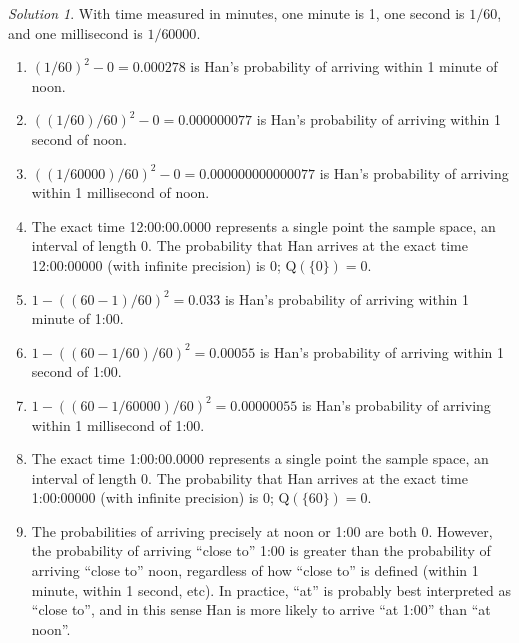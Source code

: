 \documentclass[
  letterpaper,
  DIV=11,
  numbers=noendperiod]{scrreprt}
\providecommand{\tightlist}{%
  \setlength{\itemsep}{0pt}\setlength{\parskip}{0pt}}
\theoremstyle{plain}
\theoremstyle{definition}
\theoremstyle{definition}
\theoremstyle{definition}
\theoremstyle{remark}
\newtheorem{refsolution}{Solution}[chapter]
\begin{document}
\begin{tcolorbox}[enhanced jigsaw, opacityback=0, rightrule=.15mm, coltitle=black, colframe=quarto-callout-tip-color-frame, toprule=.15mm, colbacktitle=quarto-callout-tip-color!10!white, opacitybacktitle=0.6, left=2mm, toptitle=1mm, breakable, title={Solution (click to expand)}, bottomtitle=1mm, colback=white, leftrule=.75mm, titlerule=0mm, arc=.35mm, bottomrule=.15mm]

\begin{refsolution}
With time measured in minutes, one minute is 1, one second is \(1/60\),
and one millisecond is \(1/60000\).

\begin{enumerate}
\def\labelenumi{\arabic{enumi}.}
\tightlist
\item
  \((1/60)^2 - 0 = 0.000278\) is Han's probability of arriving within 1
  minute of noon.
\item
  \(((1/60)/60)^2 - 0 = 0.000000077\) is Han's probability of arriving
  within 1 second of noon.
\item
  \(((1/60000)/60)^2 - 0= 0.000000000000077\) is Han's probability of
  arriving within 1 millisecond of noon.
\item
  The exact time 12:00:00.0000 represents a single point the sample
  space, an interval of length 0. The probability that Han arrives at
  the exact time 12:00:00000 (with infinite precision) is 0;
  \(\textrm{Q}(\{0\}) = 0\).
\item
  \(1-((60 - 1)/60)^2 = 0.033\) is Han's probability of arriving within
  1 minute of 1:00.
\item
  \(1-((60 - 1/60)/60)^2  = 0.00055\) is Han's probability of arriving
  within 1 second of 1:00.
\item
  \(1-((60 - 1/60000)/60)^2  = 0.00000055\) is Han's probability of
  arriving within 1 millisecond of 1:00.
\item
  The exact time 1:00:00.0000 represents a single point the sample
  space, an interval of length 0. The probability that Han arrives at
  the exact time 1:00:00000 (with infinite precision) is 0;
  \(\textrm{Q}(\{60\}) = 0\).
\item
  The probabilities of arriving precisely at noon or 1:00 are both 0.
  However, the probability of arriving ``close to'' 1:00 is greater than
  the probability of arriving ``close to'' noon, regardless of how
  ``close to'' is defined (within 1 minute, within 1 second, etc). In
  practice, ``at'' is probably best interpreted as ``close to'', and in
  this sense Han is more likely to arrive ``at 1:00'' than ``at noon''.
\end{enumerate}

\label{sol-meeting-probspace1d-limit-nonuniform}

\end{refsolution}

\end{tcolorbox}
\end{document}
